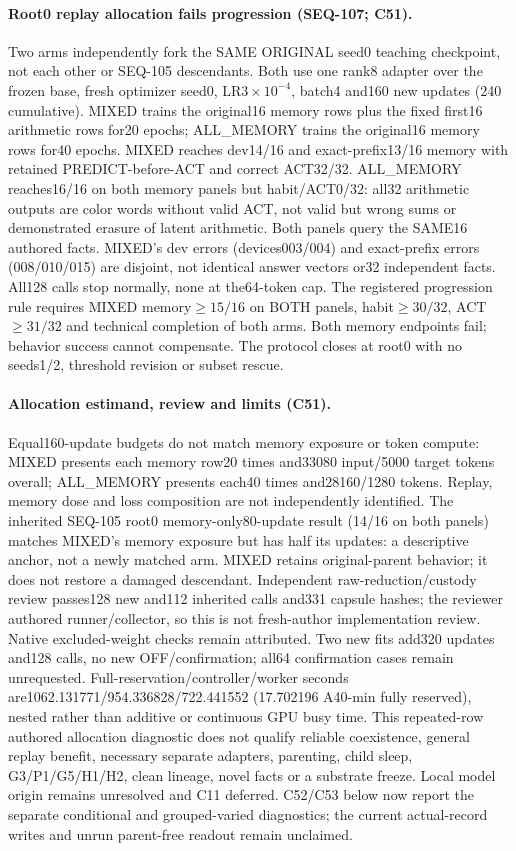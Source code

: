 \documentclass{article}
\begin{document}
\paragraph{Root0 replay allocation fails progression (SEQ-107; C51).} Two arms independently fork the SAME ORIGINAL seed0 teaching checkpoint, not each other or SEQ-105 descendants. Both use one rank8 adapter over the frozen base, fresh optimizer seed0, LR$3\times10^{-4}$, batch4 and160 new updates (240 cumulative). MIXED trains the original16 memory rows plus the fixed first16 arithmetic rows for20 epochs; ALL\_MEMORY trains the original16 memory rows for40 epochs. MIXED reaches dev14/16 and exact-prefix13/16 memory with retained PREDICT-before-ACT and correct ACT32/32. ALL\_MEMORY reaches16/16 on both memory panels but habit/ACT0/32: all32 arithmetic outputs are color words without valid ACT, not valid but wrong sums or demonstrated erasure of latent arithmetic. Both panels query the SAME16 authored facts. MIXED's dev errors (devices003/004) and exact-prefix errors (008/010/015) are disjoint, not identical answer vectors or32 independent facts. All128 calls stop normally, none at the64-token cap. The registered progression rule requires MIXED memory$\geq15/16$ on BOTH panels, habit$\geq30/32$, ACT$\geq31/32$ and technical completion of both arms. Both memory endpoints fail; behavior success cannot compensate. The protocol closes at root0 with no seeds1/2, threshold revision or subset rescue.

\paragraph{Allocation estimand, review and limits (C51).} Equal160-update budgets do not match memory exposure or token compute: MIXED presents each memory row20 times and33080 input/5000 target tokens overall; ALL\_MEMORY presents each40 times and28160/1280 tokens. Replay, memory dose and loss composition are not independently identified. The inherited SEQ-105 root0 memory-only80-update result (14/16 on both panels) matches MIXED's memory exposure but has half its updates: a descriptive anchor, not a newly matched arm. MIXED retains original-parent behavior; it does not restore a damaged descendant. Independent raw-reduction/custody review passes128 new and112 inherited calls and331 capsule hashes; the reviewer authored runner/collector, so this is not fresh-author implementation review. Native excluded-weight checks remain attributed. Two new fits add320 updates and128 calls, no new OFF/confirmation; all64 confirmation cases remain unrequested. Full-reservation/controller/worker seconds are1062.131771/954.336828/722.441552 (17.702196 A40-min fully reserved), nested rather than additive or continuous GPU busy time. This repeated-row authored allocation diagnostic does not qualify reliable coexistence, general replay benefit, necessary separate adapters, parenting, child sleep, G3/P1/G5/H1/H2, clean lineage, novel facts or a substrate freeze. Local model origin remains unresolved and C11 deferred. C52/C53 below now report the separate conditional and grouped-varied diagnostics; the current actual-record writes and unrun parent-free readout remain unclaimed.
\end{document}
